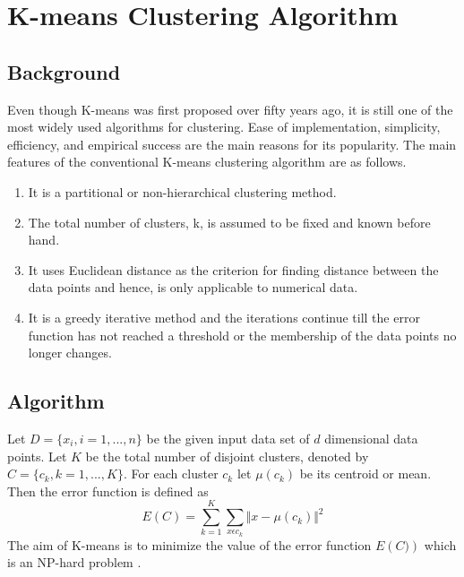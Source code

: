 \chapter{K-means Clustering Algorithm}
\section{Background}
Even though K-means was first proposed over fifty years ago, it is still one of the most widely used algorithms for clustering. Ease of implementation, simplicity, efficiency, and empirical success are the main reasons for its popularity.
The main features of the conventional K-means clustering algorithm \cite{hartigan} are as follows.
\begin{enumerate}
\item It is a partitional or non-hierarchical clustering method.
\item The total number of clusters, k, is assumed to be fixed and known before hand.
\item It uses Euclidean distance as the criterion for finding distance between the data points and hence, is only applicable to numerical data.
\item It is a greedy iterative method and the iterations continue till the error function has not reached a threshold or the membership of the data points no longer changes.
\end{enumerate}

\section{Algorithm}\label{sec:names}

Let $D = \lbrace x_{i}, i = 1,...,n \rbrace$ be the given input data set of $d$ dimensional data points. Let $K$ be the total number of disjoint clusters, denoted by $C = \lbrace c_{k}, k = 1,...,K\rbrace$. For each cluster $c_{k}$ let $\mu\left( c_{k}\right) $ be its centroid or mean. Then the error function is defined as $$E\left( C\right) = \sum_{k=1}^{K}{\sum_{x\epsilon c_{k}}^{}{\Vert x - \mu\left( c_{k}\right)\Vert^{2} }}$$
The aim of K-means is to minimize the value of the error function $E\left(C)\right)$ which is an NP-hard problem \cite{drineas}.

